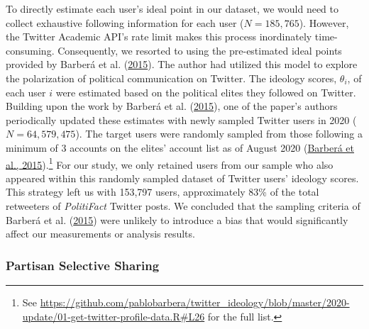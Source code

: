 \documentclass[
  12pt,
]{article}
\begin{document}
To directly estimate each user's ideal point in our dataset, we would
need to collect exhaustive following information for each user
(\(N = 185,765\)). However, the Twitter Academic API's rate limit makes
this process inordinately time-consuming. Consequently, we resorted to
using the pre-estimated ideal points provided by Barberá et al.
(\protect\hyperlink{ref-barbera2015tweeting}{2015}). The author had
utilized this model to explore the polarization of political
communication on Twitter. The ideology scores, \(\theta_i\), of each
user \(i\) were estimated based on the political elites they followed on
Twitter. Building upon the work by Barberá et al.
(\protect\hyperlink{ref-barbera2015tweeting}{2015}), one of the paper's
authors periodically updated these estimates with newly sampled Twitter
users in 2020 (\(N = 64,579,475\)). The target users were randomly
sampled from those following a minimum of 3 accounts on the elites'
account list as of August 2020
(\protect\hyperlink{ref-barbera2015tweeting}{Barberá et al.,
2015}).\footnote{See
  \url{https://github.com/pablobarbera/twitter_ideology/blob/master/2020-update/01-get-twitter-profile-data.R\#L26}
  for the full list.} For our study, we only retained users from our
sample who also appeared within this randomly sampled dataset of Twitter
users' ideology scores. This strategy left us with 153,797 users,
approximately 83\% of the total retweeters of \emph{PolitiFact} Twitter
posts. We concluded that the sampling criteria of Barberá et al.
(\protect\hyperlink{ref-barbera2015tweeting}{2015}) were unlikely to
introduce a bias that would significantly affect our measurements or
analysis results.

\hypertarget{partisan-selective-sharing}{%
\subsubsection{Partisan Selective
Sharing}\label{partisan-selective-sharing}}
\end{document}
